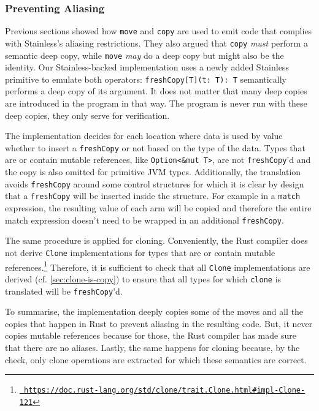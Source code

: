 \subsubsection{Preventing Aliasing}

Previous sections showed how \lstinline!move! and \lstinline!copy! are used to
emit code that complies with Stainless's aliasing restrictions. They also argued
that \lstinline!copy! \emph{must} perform a semantic deep copy, while
\lstinline!move! \emph{may} do a deep copy but might also be the identity. Our
Stainless-backed implementation uses a newly added Stainless primitive to
emulate both operators: \lstinline!freshCopy[T](t: T): T! semantically performs
a deep copy of its argument. It does not matter that many deep copies are
introduced in the program in that way. The program is never run with these deep
copies, they only serve for verification.

The implementation decides for each location where data is used by value whether
to insert a \lstinline!freshCopy! or not based on the type of the data. Types
that are or contain mutable references, like \lstinline!Option<&mut T>!, are not
\lstinline!freshCopy!'d and the copy is also omitted for primitive JVM types.
Additionally, the translation avoids \lstinline!freshCopy! around some control
structures for which it is clear by design that a \lstinline!freshCopy! will be
inserted inside the structure. For example in a \lstinline!match! expression,
the resulting value of each arm will be copied and therefore the entire match
expression doesn't need to be wrapped in an additional \lstinline!freshCopy!.

The same procedure is applied for cloning. Conveniently, the Rust compiler does
not derive \lstinline!Clone! implementations for types that are or contain
mutable references.\footnote{\href{}{\texttt{\color{MidnightBlue}
https://doc.rust-lang.org/std/clone/trait.Clone.html\#impl-Clone-121}}}
Therefore, it is sufficient to check that all \lstinline!Clone! implementations
are derived (cf. \autoref{sec:clone-is-copy}) to ensure that all types for which
\lstinline!clone! is translated will be \lstinline!freshCopy!'d.

To summarise, the implementation deeply copies some of the moves and all the
copies that happen in Rust to prevent aliasing in the resulting code. But, it
never copies mutable references because for those, the Rust compiler has made
sure that there are no aliases. Lastly, the same happens for cloning because, by
the check, only clone operations are extracted for which these semantics are
correct.


